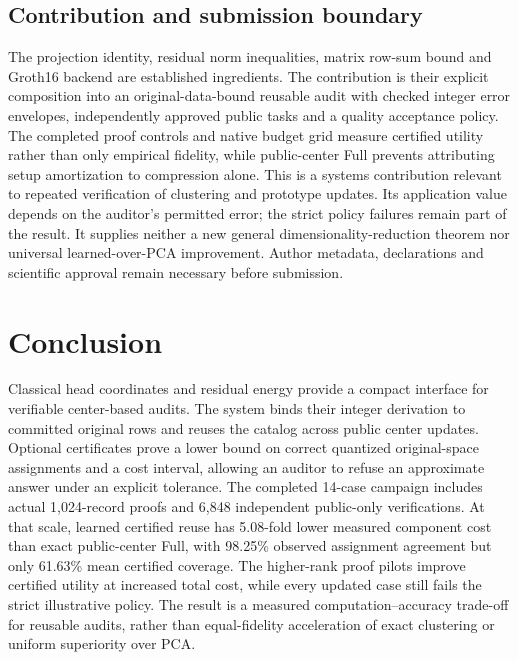 \subsection{Contribution and submission boundary}
The projection identity, residual norm inequalities, matrix row-sum bound and Groth16 backend are established ingredients. The contribution is their explicit composition into an original-data-bound reusable audit with checked integer error envelopes, independently approved public tasks and a quality acceptance policy. The completed proof controls and native budget grid measure certified utility rather than only empirical fidelity, while public-center Full prevents attributing setup amortization to compression alone. This is a systems contribution relevant to repeated verification of clustering and prototype updates. Its application value depends on the auditor's permitted error; the strict policy failures remain part of the result. It supplies neither a new general dimensionality-reduction theorem nor universal learned-over-PCA improvement. Author metadata, declarations and scientific approval remain necessary before submission.

\section{Conclusion}\label{sec:conclusion}
Classical head coordinates and residual energy provide a compact interface for verifiable center-based audits. The system binds their integer derivation to committed original rows and reuses the catalog across public center updates. Optional certificates prove a lower bound on correct quantized original-space assignments and a cost interval, allowing an auditor to refuse an approximate answer under an explicit tolerance. The completed 14-case campaign includes actual 1,024-record proofs and 6,848 independent public-only verifications. At that scale, learned certified reuse has 5.08-fold lower measured component cost than exact public-center Full, with 98.25\% observed assignment agreement but only 61.63\% mean certified coverage. The higher-rank proof pilots improve certified utility at increased total cost, while every updated case still fails the strict illustrative policy. The result is a measured computation--accuracy trade-off for reusable audits, rather than equal-fidelity acceleration of exact clustering or uniform superiority over PCA.
